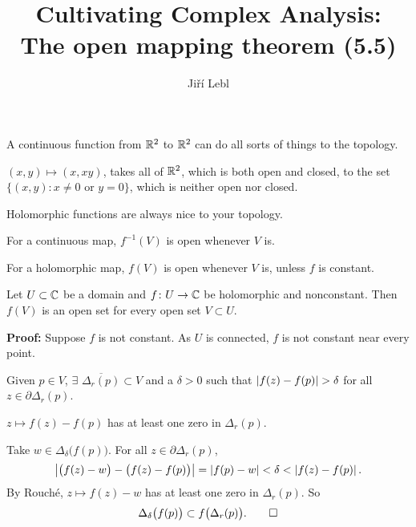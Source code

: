 \documentclass[10pt,aspectratio=169]{beamer}
\author{Ji\v{r}\'i Lebl}
\institute[OSU]{%
Departemento pri Matematiko de Oklahoma {\^S}tata Universitato}
\title{Cultivating Complex Analysis:\\%
The open mapping theorem (5.5)}
\date{}
\begin{document}
\begin{frame}
\titlepage
\end{frame}

\begin{frame}
A continuous function from ${\mathbb{R}}^2$ to ${\mathbb{R}}^2$ can do all
sorts of things to the topology.

\medskip
\pause

$(x,y) \mapsto (x,xy)$,
takes all of ${\mathbb{R}}^2$, which is both open and closed, to the
set $\bigl\{ (x,y) : x \not= 0 \text{ or } y=0 \bigr\}$, which is neither open nor
closed.

\medskip
\pause

Holomorphic functions are always nice to your topology.

\medskip
\pause

For a continuous map, $f^{-1}(V)$ is open whenever $V$ is.

\medskip
\pause

For a holomorphic map, $f(V)$ is open whenever $V$ is, unless $f$ is
constant.

\end{frame}

\begin{frame}
\begin{theorem}
Let $U \subset {\mathbb{C}}$ be a domain and $f \colon U \to {\mathbb{C}}$ be
holomorphic and nonconstant.  Then $f(V)$ is an open set for every open set
$V \subset U$.
\end{theorem}

\medskip
\pause

\textbf{Proof:}
Suppose $f$ is not constant.  As $U$ is connected, $f$ is not constant
near every point.

\medskip
\pause

Given $p \in V$, \quad $\exists$ 
$\overline{\Delta_r(p)} \subset V$ and a $\delta > 0$
such that
$\left\lvert {f(z)-f(p)} \right\rvert > \delta$ for all $z \in \partial \Delta_r(p)$.

\medskip
\pause

$z \mapsto f(z)-f(p)$ has at least one zero in $\Delta_r(p)$.

\medskip
\pause

Take $w \in \Delta_{\delta}\bigl(f(p)\bigr)$.  For
all $z \in \partial \Delta_r(p)$,
\begin{equation*}
\left\lvert {\bigl( f(z)-w \bigr) - \bigl( f(z)-f(p) \bigr)} \right\rvert = \left\lvert {f(p)-w} \right\rvert <
\delta < \left\lvert {f(z)-f(p)} \right\rvert .
\end{equation*}
\pause
By Rouch\'e, $z \mapsto f(z)-w$ has at least one
zero in $\Delta_r(p)$. \pause So
\begin{equation*}
\Delta_{\delta}\bigl(f(p)\bigr) \subset
f\bigl(\Delta_r(p)\bigr) . \qed
\end{equation*}
\end{frame}
\end{document}
